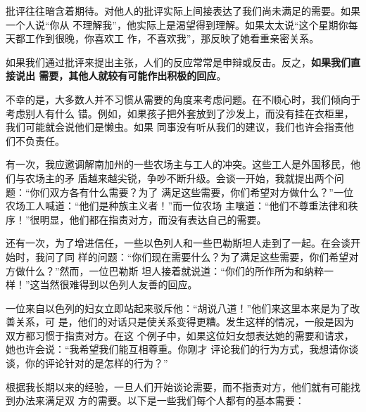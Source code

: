 \documentclass{ctexart}
\begin{document}
批评往往暗含着期待。对他人的批评实际上间接表达了我们尚未满足的需要。如果一个人说``你从
不理解我''，他实际上是渴望得到理解。如果太太说``这个星期你每天都工作到很晚，你喜欢工
作，不喜欢我''，那反映了她看重亲密关系。

如果我们通过批评来提出主张，人们的反应常常是申辩或反击。反之，\textbf{如果我们直接说出
	需要，其他人就较有可能作出积极的回应}。

不幸的是，大多数人并不习惯从需要的角度来考虑问题。在不顺心时，我们倾向于考虑别人有什么
错。例如，如果孩子把外套放到了沙发上，而没有挂在衣柜里，我们可能就会说他们是懒虫。如果
同事没有听从我们的建议，我们也许会指责他们不负责任。

有一次，我应邀调解南加州的一些农场主与工人的冲突。这些工人是外国移民，他们与农场主的矛
盾越来越尖锐，争吵不断升级。会谈一开始，我就提出两个问题：``你们双方各有什么需要？为了
满足这些需要，你们希望对方做什么？''一位农场工人喊道：``他们是种族主义者！''而一位农场
主嚷道：``他们不尊重法律和秩序！''很明显，他们都在指责对方，而没有表达自己的需要。

还有一次，为了增进信任，一些以色列人和一些巴勒斯坦人走到了一起。在会谈开始时，我问了同
样的问题：``你们现在需要什么？为了满足这些需要，你们希望对方做什么？''然而，一位巴勒斯
坦人接着就说道：``你们的所作所为和纳粹一样！''这当然很难得到以色列人友善的回应。

一位来自以色列的妇女立即站起来驳斥他：``胡说八道！''他们来这里本来是为了改善关系，可
是，他们的对话只是使关系变得更糟。发生这样的情况，一般是因为双方都习惯于指责对方。在这
个例子中，如果这位妇女想表达她的需要和请求，她也许会说：``我希望我们能互相尊重。你刚才
评论我们的行为方式，我想请你谈谈，你的评论针对的是怎样的行为？''

根据我长期以来的经验，一旦人们开始谈论需要，而不指责对方，他们就有可能找到办法来满足双
方的需要。以下是一些我们每个人都有的基本需要：
\end{document}
